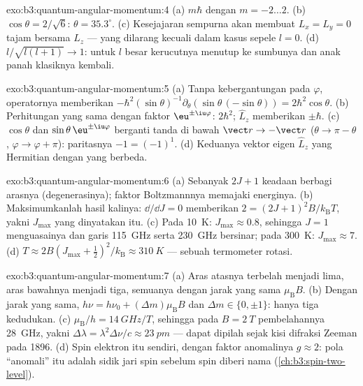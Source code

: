 \begin{solution}{exo:b3:quantum-angular-momentum:4}
(a) $m\hbar$ dengan $m = -2 \dots 2$. (b) $\cos\theta = 2/\sqrt6$:
$\theta = 35.3^\circ$. (c) Kesejajaran sempurna akan membuat $L_x = L_y
= 0$ tajam bersama $L_z$ --- yang dilarang  kecuali dalam
kasus sepele $l = 0$. (d) $l/\sqrt{l(l+1)} \to 1$: untuk
$l$ besar kerucutnya menutup ke sumbunya dan anak panah klasiknya
kembali.
\end{solution}

\begin{solution}{exo:b3:quantum-angular-momentum:5}
(a) Tanpa kebergantungan pada $\varphi$, operatornya memberikan
$-\hbar^2(\sin\theta)^{-1}\partial_\theta(\sin\theta\,(-\sin\theta))
= 2\hbar^2\cos\theta$. (b) Perhitungan yang sama dengan faktor
$\eu^{\pm\iu\varphi}$:  $2\hbar^2$; $\hat L_z$
memberikan $\pm\hbar$. (c) $\cos\theta$ dan $\sin\theta\,\eu^{\pm\iu
\varphi}$ berganti tanda di bawah $\vect r \to -\vect r$ ($\theta \to \pi
- \theta$, $\varphi \to \varphi + \pi$): paritasnya $-1 = (-1)^1$. (d)
Keduanya vektor eigen $\hat L_z$ yang Hermitian dengan  yang
berbeda.
\end{solution}

\begin{solution}{exo:b3:quantum-angular-momentum:6}
(a) Sebanyak $2J + 1$ keadaan berbagi arasnya (degenerasinya); faktor
Boltzmannnya memajaki energinya. (b) Maksimumkanlah hasil kalinya:
$\dd/\dd J = 0$ memberikan $2 = (2J+1)^2B/k_{\text{B}}T$, yakni
$J_{\max}$ yang dinyatakan itu. (c) Pada
\qty{10}{K}: $J_{\max} \approx 0.8$, sehingga $J = 1$ menguasainya dan
garis \qty{115}{GHz} serta \qty{230}{GHz} bersinar; pada \qty{300}{K}:
$J_{\max} \approx 7$. (d) $T \approx 2B(J_{\max} + \tfrac12)^2/
k_{\text{B}} \approx \qty{310}{K}$ --- sebuah termometer rotasi.
\end{solution}

\begin{solution}{exo:b3:quantum-angular-momentum:7}
(a) Aras atasnya terbelah menjadi lima, aras bawahnya menjadi tiga,
semuanya dengan jarak yang sama $\mu_{\text{B}}B$. (b) Dengan jarak yang
sama, $h\nu = h\nu_0 + (\Delta m)\mu_{\text{B}}B$ dan $\Delta m \in \{0,
\pm1\}$: hanya tiga kedudukan. (c) $\mu_{\text{B}}/h = \qty{14}{GHz/T}$, sehingga pada $B = \qty{2}{T}$
pembelahannya \qty{28}{GHz}, yakni $\Delta\lambda =
\lambda^2\Delta\nu/c \approx \qty{23}{pm}$ --- dapat dipilah sejak kisi
difraksi Zeeman pada 1896.
(d) Spin elektron itu sendiri, dengan faktor anomalinya $g \approx
2$: pola ``anomali'' itu adalah sidik jari spin sebelum spin diberi nama
(\cref{ch:b3:spin-two-level}).
\end{solution}

